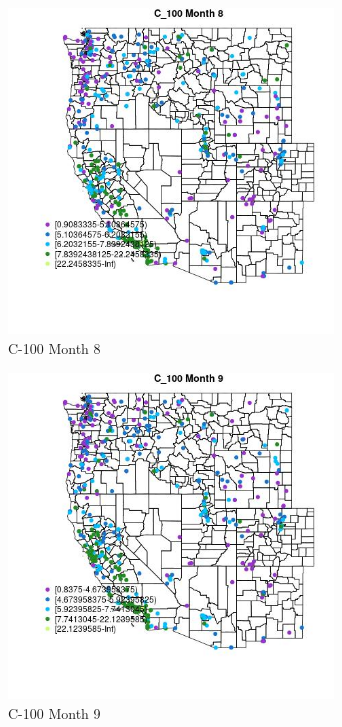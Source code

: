 \begin{figure} 
\centering  
\includegraphics[width=0.77\textwidth]{Code_Outputs/ML_input_report_ML_input_PM25_Step5_part_d_de_duplicated_aves_ML_input_MapObsMo8C_100.jpg} 
\caption{\label{fig:ML_input_report_ML_input_PM25_Step5_part_d_de_duplicated_aves_ML_inputMapObsMo8C_100}C-100 Month 8} 
\end{figure} 
 

\begin{figure} 
\centering  
\includegraphics[width=0.77\textwidth]{Code_Outputs/ML_input_report_ML_input_PM25_Step5_part_d_de_duplicated_aves_ML_input_MapObsMo9C_100.jpg} 
\caption{\label{fig:ML_input_report_ML_input_PM25_Step5_part_d_de_duplicated_aves_ML_inputMapObsMo9C_100}C-100 Month 9} 
\end{figure} 
 

